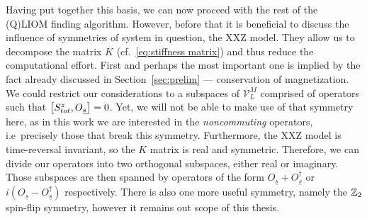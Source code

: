 Having put together this basis, we can now proceed with the rest of the (Q)LIOM finding algorithm.
However, before that it is beneficial to discuss the influence of symmetries of system in question,
the XXZ model. They allow us to decompose the matrix \(K\) 
(cf.~\eqref{eq:stiffness matrix}) and thus reduce the computational effort. First and perhaps
the most important one is implied by the fact already discussed in Section~\ref{sec:prelim} ---
conservation of magnetization. We could restrict our considerations to a subspaces
of \(\mathcal{V}_L^M\) comprised of operators such that \(\comm{S_{tot}^z}{O_{\underline{s}}} = 0\).
Yet, we will not be able to make use of that symmetry here, as in this work we are interested 
in the \textit{noncommuting} operators, i.e\ precisely those that break this symmetry.
Furthermore, the XXZ model is time-reversal invariant, so the \(K\) matrix is real and symmetric.
Therefore, we can divide our operators into two orthogonal subspaces, either real or imaginary.
Those subspaces are then spanned by operators of the form 
\(O_{\underline{s}}+O^{\dagger}_{\underline{s}}\) or 
\(i(O_{\underline{s}}-O^{\dagger}_{\underline{s}})\) respectively. There is also one more
useful symmetry, namely the \(\mathbb{Z}_2\) spin-flip symmetry, however it remains out scope of
this thesis. 


